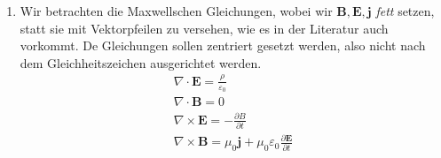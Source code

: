 \documentclass{article}
\newcommand{\p}{\partial}
\newcommand\bb[1]{\boldsymbol{#1}}
\begin{document}
\begin{enumerate}
\item Wir betrachten die Maxwellschen Gleichungen, wobei wir
  \(\bb{B}, \bb{E}, \bb{j}\) \textit{fett} setzen, statt sie mit
  Vektorpfeilen zu versehen, wie es in der Literatur auch vorkommt.
  De Gleichungen sollen zentriert gesetzt werden, also nicht nach dem
  Gleichheitszeichen ausgerichtet werden.
  \begin{gather*}
    \nabla \cdot \bb{E} = \frac{\rho}{\varepsilon_{0}} \\
    \nabla \cdot \bb{B} = 0 \\
    \nabla \times \bb{E} = -\frac{\partial B}{\partial t} \\
    \nabla \times \bb{B} = \mu_{0} \bb{j} + \mu_{0} \varepsilon_{0} \frac{\p \bb{E}}{\p t}    
  \end{gather*}
\end{enumerate}
\end{document}
